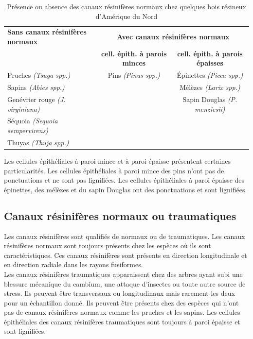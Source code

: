 \begin{table}[ht]
	\centering
	
	\begin{tabular}{l c c}
		\hline
		\bf Sans canaux résinifères normaux	& \multicolumn{2}{c}{\textbf{Avec canaux résinifères normaux}}\\
		& \bf cell. épith. à parois minces & \bf cell. épith. à parois épaisses\\
		\hline\hline
		Pruches \textit{(Tsuga spp.)} &	Pins \textit{(Pinus spp.)} &	Épinettes \textit{(Picea spp.)}\\
		Sapins \textit{(Abies spp.)} & & Mélèzes \textit{(Larix spp.)}\\
		Genévrier rouge \textit{(J. virginiana)} & & Sapin Douglas \textit{(P. menziesii)}\\
		Séquoia \textit{(Sequoia sempervirens)} &&\\
		Thuyas \textit{(Thuja spp.)}&&\\
		\hline
	\end{tabular}
	
	\caption{\label{tab:mince_epaisse} Présence ou absence des canaux résinifères normaux chez quelques bois résineux d’Amérique du Nord}
\end{table}

Les cellules épithéliales à paroi mince et à paroi épaisse présentent certaines particularités. Les cellules épithéliales à paroi mince des pins n'ont pas de ponctuations et ne sont pas lignifiées. Les cellules épithéliales à paroi épaisse des épinettes, des mélèzes et du sapin Douglas ont des ponctuations et sont lignifiées.

\subsection{Canaux résinifères normaux ou traumatiques}

Les canaux résinifères sont qualifiés de normaux ou de traumatiques. Les canaux résinifères normaux sont toujours présents chez les espèces où ils sont caractéristiques. Ces canaux résinifères sont présents en direction longitudinale et en direction radiale dans les rayons fusiformes.\\

Les canaux résinifères traumatiques apparaissent chez des arbres ayant subi une blessure mécanique du cambium, une attaque d'insectes ou toute autre source de stress. Ils peuvent être transversaux ou longitudinaux mais rarement les deux pour un échantillon donné. Ils peuvent être présents chez des espèces qui n'ont pas de canaux résinifères normaux comme les pruches et les sapins. Les cellules épithéliales des canaux résinifères traumatiques sont toujours à paroi épaisse et sont lignifiées.

